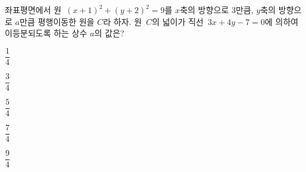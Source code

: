 좌표평면에서 원~$(x+1)^2+(y+2)^2=9$를 $x$축의 방향으로 $3$만큼, $y$축의 방향으로 $a$만큼 평행이동한 원을 $C$라 하자. 원~$C$의 넓이가 직선~$3x+4y-7=0$에 의하여 이등분되도록 하는 상수 $a$의 값은?
\begin{choices32}{\rule[-3ex]{0pt}{8ex}$\dfrac{1}{4}$}{\rule[-3ex]{0pt}{8ex}$\dfrac{3}{4}$}{\rule[-3ex]{0pt}{8ex}$\dfrac{5}{4}$}{\rule[-3ex]{0pt}{8ex}$\dfrac{7}{4}$}{\rule[-3ex]{0pt}{8ex}$\dfrac{9}{4}$}\end{choices32}
